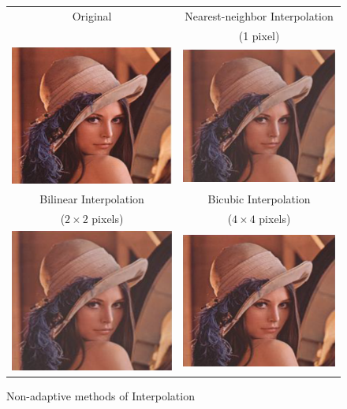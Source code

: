 \begin{figure}[t]
\centering
{\sffamily
\begin{tabular}{cc}
Original & Nearest-neighbor Interpolation\\
 & (1 pixel) \\
\includegraphics[width=.4\linewidth]{img/preprocessing/interp_orig.png}
&
\includegraphics[width=.4\linewidth]{img/preprocessing/interp_nn.png}
\vspace{1em} \\
Bilinear Interpolation & Bicubic Interpolation \\
($2\times2$ pixels) & ($4\times4$ pixels) \\
\includegraphics[width=.4\linewidth]{img/preprocessing/interp_bili.png}
&
\includegraphics[width=.4\linewidth]{img/preprocessing/interp_bicubic.png}
\end{tabular}
}
\caption{Non-adaptive methods of Interpolation}
\label{fig:preprocessInterpolation}
\end{figure}

